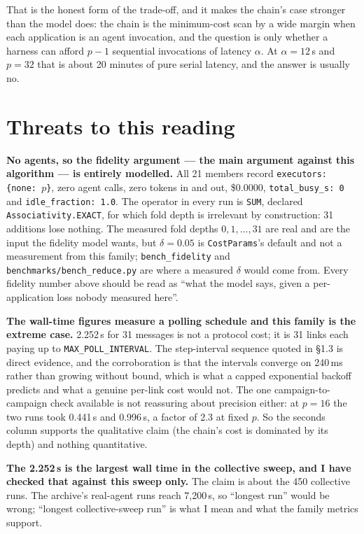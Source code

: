 \documentclass[11pt]{article}
\begin{document}
That is the honest form of the trade-off, and it makes the chain's case stronger than the model
does: the chain is the minimum-cost scan by a wide margin when each application is an agent
invocation, and the question is only whether a harness can afford $p-1$ sequential invocations of
latency $\alpha$. At $\alpha = 12$\,s and $p = 32$ that is about 20 minutes of pure serial
latency, and the answer is usually no.

\section{Threats to this reading}

\textbf{No agents, so the fidelity argument --- the main argument against this algorithm --- is
entirely modelled.} All 21 members record \texttt{executors: \{none: $p$\}}, zero agent calls,
zero tokens in and out, \$0.0000, \texttt{total\_busy\_s: 0} and \texttt{idle\_fraction: 1.0}. The
operator in every run is \texttt{SUM}, declared \texttt{Associativity.EXACT}, for which fold depth
is irrelevant by construction: 31 additions lose nothing. The measured fold depths
$0, 1, \ldots, 31$ are real and are the input the fidelity model wants, but
$\delta = 0.05$ is \texttt{CostParams}'s default and not a measurement from this family;
\texttt{bench\_fidelity} and \texttt{benchmarks/bench\_reduce.py} are where a measured $\delta$
would come from. Every fidelity number above should be read as ``what the model says, given a
per-application loss nobody measured here''.

\textbf{The wall-time figures measure a polling schedule and this family is the extreme case.}
2.252\,s for 31 messages is not a protocol cost; it is 31 links each paying up to
\texttt{MAX\_POLL\_INTERVAL}. The step-interval sequence quoted in \S1.3 is direct evidence, and
the corroboration is that the intervals converge on 240\,ms rather than growing without bound,
which is what a capped exponential backoff predicts and what a genuine per-link cost would not. The
one campaign-to-campaign check available is not reassuring about precision either: at $p=16$ the
two runs took 0.441\,s and 0.996\,s, a factor of 2.3 at fixed $p$. So the seconds column supports
the qualitative claim (the chain's cost is dominated by its depth) and nothing quantitative.

\textbf{The 2.252\,s is the largest wall time in the collective sweep, and I have checked that
against this sweep only.} The claim is about the 450 collective runs. The archive's real-agent
runs reach 7{,}200\,s, so ``longest run'' would be wrong; ``longest collective-sweep run'' is what
I mean and what the family metrics support.
\end{document}
